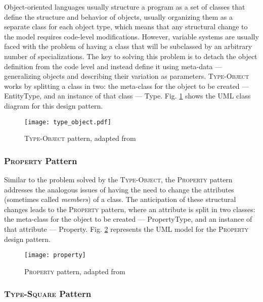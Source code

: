 Object-oriented languages usually structure a program as a set of classes that define the structure and behavior of objects, usually organizing them as a separate class for each object type, which means that any structural change to the model requires code-level modifications. However, variable systems are usually faced with the problem of having a class that will be subclassed by an arbitrary number of specializations. The key to solving this problem is to detach the object definition from the code level and instead define it using meta-data --- generalizing objects and describing their variation as parameters. \textsc{Type-Object} works by splitting a class in two\cite{YBJ01}: the meta-class for the object to be created --- EntityType, and an instance of that class --- Type. Fig. \ref{fig:type-object_pattern} shows the UML class diagram for this design pattern.

\begin{figure}[H]
  \centering
  \texttt{[image: type\_object.pdf]}
  \caption{\textsc{Type-Object} pattern, adapted from \cite{metadata_and_active_object_models}}
  \label{fig:type-object_pattern}
\end{figure}

\subsubsection{\textsc{Property} Pattern}\label{sec:property_pattern}

Similar to the problem solved by the \textsc{Type-Object}, the \textsc{Property} pattern addresses the analogous issues of having the need to change the attributes (sometimes called \emph{members}) of a class. The anticipation of these structural changes leads to the \textsc{Property} pattern, where an attribute is split in two classes: the meta-class for the object to be created --- PropertyType, and an instance of that attribute --- Property. Fig. \ref{fig:property_pattern} represents the UML model for the \textsc{Property} design pattern.

\begin{figure}[H]
  \centering
  \texttt{[image: property]}
  \caption{\textsc{Property} pattern, adapted from \cite{metadata_and_active_object_models}}
  \label{fig:property_pattern}
\end{figure}

\subsubsection{\textsc{Type-Square} Pattern}\label{sec:type-square_pattern}

